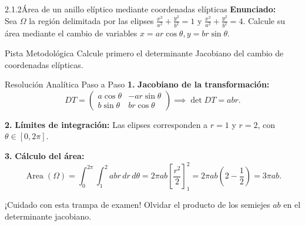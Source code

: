 \documentclass[11pt,a4paper]{article}
\begin{document}
\begin{nivelbox}{2.1.2}{Área de un anillo elíptico mediante coordenadas elípticas}
\textbf{Enunciado:}\\
Sea $\Omega$ la región delimitada por las elipses $\frac{x^2}{a^2} + \frac{y^2}{b^2} = 1$ y $\frac{x^2}{a^2} + \frac{y^2}{b^2} = 4$. Calcule su área mediante el cambio de variables $x = a r \cos\theta, y = b r \sin\theta$.

\begin{observacionbox}{Pista Metodológica}
Calcule primero el determinante Jacobiano del cambio de coordenadas elípticas.
\end{observacionbox}

\begin{ejerciciobox}{Resolución Analítica Paso a Paso}
\smallskip\noindent\textbf{1.} \textbf{Jacobiano de la transformación:}
\[DT = \begin{pmatrix} a\cos\theta & -ar\sin\theta \\ b\sin\theta & br\cos\theta \end{pmatrix} \implies \det DT = ab r.\]

\smallskip\noindent\textbf{2.} \textbf{Límites de integración:}
Las elipses corresponden a $r = 1$ y $r = 2$, con $\theta \in [0, 2\pi]$.

\smallskip\noindent\textbf{3.} \textbf{Cálculo del área:}
\[\operatorname{Area}(\Omega) = \int_0^{2\pi} \int_1^2 ab r \, dr \, d\theta = 2\pi ab \left[ \frac{r^2}{2} \right]_1^2 = 2\pi ab \left( 2 - \frac{1}{2} \right) = 3\pi ab.\]
\end{ejerciciobox}

\begin{errorbox}{¡Cuidado con esta trampa de examen!}
Olvidar el producto de los semiejes $ab$ en el determinante jacobiano.
\end{errorbox}
\end{nivelbox}
\bigskip
\end{document}
